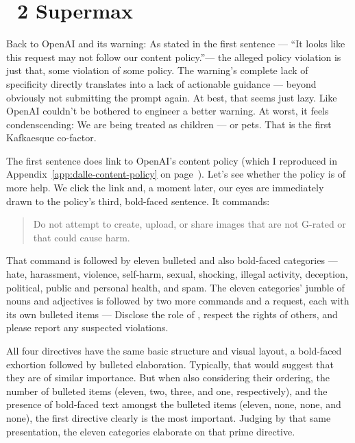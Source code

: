 \section{\DDAALLEE\ 2 Supermax}
\label{sec:dalle}

Back to OpenAI and its warning: As stated in the first sentence --- ``It looks
like this request may not follow our content policy.''--- the alleged policy
violation is just that, some violation of some policy. The warning's complete
lack of specificity directly translates into a lack of actionable guidance —
beyond obviously not submitting the prompt again. At best, that seems just lazy.
Like OpenAI couldn't be bothered to engineer a better warning. At worst, it
feels condenscending: We are being treated as children --- or pets. That is the
first Kafkaesque co-factor.

The first sentence does link to OpenAI's content policy (which I reproduced in
Appendix~\ref{app:dalle-content-policy} on
page~\pageref{app:dalle-content-policy}). Let's see whether the policy is of
more help. We click the link and, a moment later, our eyes are immediately drawn
to the policy's third, bold-faced sentence. It commands:

\begin{quote}
\openfat{}Do not attempt to create, upload, or share images that are not
G-rated or that could cause harm.\closefat{}
\end{quote}

\noindent{}That command is followed by eleven bulleted and also bold-faced
categories — hate, harassment, violence, self-harm, sexual, shocking, illegal
activity, deception, political, public and personal health, and spam. The eleven
categories' jumble of nouns and adjectives is followed by two more commands and
a request, each with its own bulleted items — Disclose the role of \AI, respect
the rights of others, and please report any suspected violations.

All four directives have the same basic structure and visual layout, a
bold-faced exhortion followed by bulleted elaboration. Typically, that would
suggest that they are of similar importance. But when also considering their
ordering, the number of bulleted items (eleven, two, three, and one,
respectively), and the presence of bold-faced text amongst the bulleted items
(eleven, none, none, and none), the first directive clearly is the most
important. Judging by that same presentation, the eleven categories elaborate on
that prime directive.

